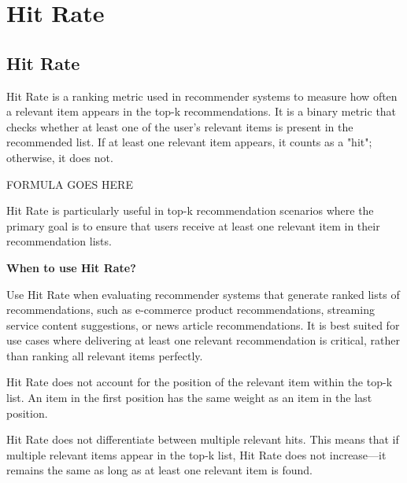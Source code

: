 
\clearpage
\thispagestyle{rankingstyle}
\section{Hit Rate}
\subsection{Hit Rate}

Hit Rate is a ranking metric used in recommender systems to measure how often a relevant item appears in the top-k
recommendations. It is a binary metric that checks whether at least one of the user's relevant items is present in the
recommended list. If at least one relevant item appears, it counts as a "hit"; otherwise, it does not.

\begin{center}
    FORMULA GOES HERE
\end{center}

Hit Rate is particularly useful in top-k recommendation scenarios where the primary goal is to ensure that users receive at
least one relevant item in their recommendation lists.

\textbf{When to use Hit Rate?}

Use Hit Rate when evaluating recommender systems that generate ranked lists of recommendations, such as e-commerce product
recommendations, streaming service content suggestions, or news article recommendations. It is best suited for use cases
where delivering at least one relevant recommendation is critical, rather than ranking all relevant items perfectly.

{
    \item Hit Rate does not account for the position of the relevant item within the top-k list. An item in the first
    position has the same weight as an item in the last position.
    \item Hit Rate does not differentiate between multiple relevant hits. This means that if multiple relevant
    items appear in the top-k list, Hit Rate does not increase—it remains the same as long as at least one relevant
    item is found.
}


